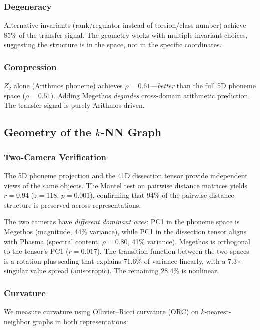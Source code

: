 \documentclass[11pt,a4paper]{article}
\begin{document}
\subsubsection{Degeneracy}

Alternative invariants (rank/regulator instead of torsion/class number) achieve 85\% of the transfer signal. The geometry works with multiple invariant choices, suggesting the structure is in the space, not in the specific coordinates.

\subsubsection{Compression}

$Z_2$ alone (Arithmos phoneme) achieves $\rho = 0.61$---\emph{better} than the full 5D phoneme space ($\rho = 0.51$). Adding Megethos \emph{degrades} cross-domain arithmetic prediction. The transfer signal is purely Arithmos-driven.

\subsection{Geometry of the $k$-NN Graph}

\subsubsection{Two-Camera Verification}

The 5D phoneme projection and the 41D dissection tensor provide independent views of the same objects. The Mantel test on pairwise distance matrices yields $r = 0.94$ ($z = 118$, $p = 0.001$), confirming that 94\% of the pairwise distance structure is preserved across representations.

The two cameras have \emph{different dominant axes}: PC1 in the phoneme space is Megethos (magnitude, 44\% variance), while PC1 in the dissection tensor aligns with Phasma (spectral content, $\rho = 0.80$, 41\% variance). Megethos is orthogonal to the tensor's PC1 ($r = 0.017$). The transition function between the two spaces is a rotation-plus-scaling that explains 71.6\% of variance linearly, with a 7.3$\times$ singular value spread (anisotropic). The remaining 28.4\% is nonlinear.

\subsubsection{Curvature}

We measure curvature using Ollivier--Ricci curvature (ORC) on $k$-nearest-neighbor graphs in both representations:
\end{document}
